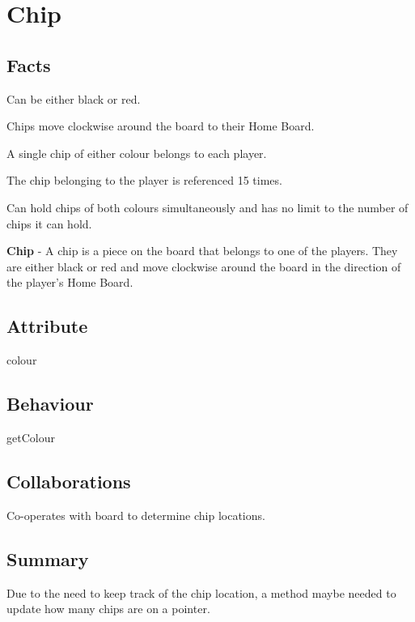 \section{Chip}

\subsection{Facts}
\begin{dashed}
    \item Can be either black or red.
    \item Chips move clockwise around the board to their Home Board.
    \item A single chip of either colour belongs to each player.
    \item The chip belonging to the player is referenced 15 times.
    \item Can hold chips of both colours simultaneously and has no limit to the number of chips it can hold.
\end{dashed}

\noindent
\newline\textbf{Chip} - A chip is a piece on the board that belongs to one of the players. They are either black or red and move clockwise around the board in the direction of the player's Home Board.

\subsection{Attribute}
\begin{dashed}
    \item colour
\end{dashed}

\subsection{Behaviour}
\begin{dashed}
    \item getColour
\end{dashed}

\subsection{Collaborations}
\begin{dashed}
    \item Co-operates with board to determine chip locations.
\end{dashed}

\subsection{Summary}
Due to the need to keep track of the chip location, a method maybe needed to update how many chips
are on a pointer.
